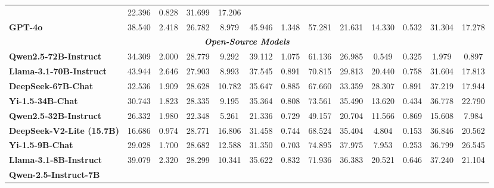 \begin{table*}[thbp]
\begin{threeparttable}
{\begin{tabular}{@{}lcccc|cccc|cccc@{}}
& 22.396 & 0.828 & 31.699 & 17.206\\
\textbf{GPT-4o} 
 
& 38.540 & 2.418 & 26.782 & 8.979 
& 45.946 & 1.348 & 57.281 & 21.631

& 14.330 & 0.532 & 31.304 & 17.278\\
\midrule
\multicolumn{13}{c}{\textit{\textbf{Open-Source Models}}} \\
\textbf{Qwen2.5-72B-Instruct}  

& 34.309 & 2.000 & 28.779 & 9.292 
& 39.112 & 1.075 & 61.136 & 26.985

& 0.549 & 0.325 & 1.979 & 0.897\\
\textbf{Llama-3.1-70B-Instruct}  

& 43.944 & 2.646 & 27.903 & 8.993 
& 37.545 & 0.891 & 70.815 & 29.813

& 20.440 & 0.758 & 31.604 & 17.813\\
\textbf{DeepSeek-67B-Chat} 

& 32.536 & 1.909 & 28.628 & 10.782 
& 35.647 & 0.885 & 67.660 & 33.359

& 28.307 & 0.891 & 37.219 & 17.944\\
\textbf{Yi-1.5-34B-Chat}  

& 30.743 & 1.823 & 28.335 & 9.195 
& 35.364 & 0.808 & 73.561 & 35.490

& 13.620 & 0.434 & 36.778 & 22.790 \\
\textbf{Qwen2.5-32B-Instruct}  

& 26.332 & 1.980 & 22.348 & 5.261
& 21.336 & 0.729 & 49.157 & 20.704

& 11.566 & 0.869 & 15.608 & 7.984\\
\textbf{DeepSeek-V2-Lite (15.7B)}  

& 16.686 & 0.974 & 28.771 & 16.806
& 31.458 & 0.744 & 68.524 & 35.404

& 4.804 & 0.153 & 36.846 & 20.562\\
\textbf{Yi-1.5-9B-Chat}  

& 29.028 & 1.700 & 28.682 & 12.588 
& 31.350 & 0.703 & 74.895 & 37.975

 & 7.953 & 0.253 & 36.799 & 26.545 \\
\textbf{Llama-3.1-8B-Instruct}  

& 39.079 & 2.320 & 28.299 & 10.341
& 35.622 & 0.832 & 71.936 & 36.383

& 20.521 & 0.646 & 37.240 & 21.104\\
\textbf{Qwen-2.5-Instruct-7B}  


\end{tabular}}
\end{threeparttable}
\end{table*}
